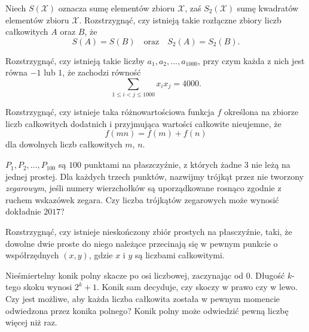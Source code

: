 \begin{problem}{1}
	Niech $S(\mathcal{X})$ oznacza sumę elementów zbioru $\mathcal{X}$, zaś $S_2(\mathcal{X})$ sumę kwadratów elementów zbioru $\mathcal{X}$. Rozstrzygnąć, czy istnieją takie rozłączne zbiory liczb całkowitych $A$ oraz $B$, że
	\[
		S(A) = S(B) \quad \text{oraz} \quad S_2(A) = S_2(B).
	\]
\end{problem}

\begin{problem}{1}
	Rozstrzygnąć, czy istnieją takie liczby $a_1, a_2, ..., a_{1000}$, przy czym każda z nich jest równa $-1$ lub $1$, że zachodzi równość
	\[
		\sum_{1 \leqslant i < j \leqslant 1000} x_ix_j = 4000.
	\]
\end{problem}

\begin{problem}{1}
	Rozstrzygnąć, czy istnieje taka różnowartościowa funkcja $f$ określona na zbiorze liczb całkowitych dodatnich i przyjmująca wartości całkowite nieujemne, że
	\[
		f(mn) = f(m) + f(n)
	\]
	dla dowolnych liczb całkowitych $m$, $n$.
\end{problem}


\begin{problem}{1}
	$P_1,P_2,\ldots,P_{100}$ są $100$ punktami na płaszczyźnie, z których żadne 3 nie leżą na jednej prostej. Dla każdych trzech punktów, nazwijmy trójkąt przez nie tworzony \textit{zegarowym}, jeśli numery wierzchołków są uporządkowane rosnąco zgodnie z ruchem wskazówek zegara. Czy liczba trójkątów zegarowych może wynosić dokładnie $2017$?
\end{problem}

\begin{problem}{1}
	Rozstrzygnąć, czy istnieje nieskończony zbiór prostych na płasczyźnie, taki, że dowolne dwie proste do niego należące przecinają się w pewnym punkcie o współrzędnych $(x, y)$, gdzie $x$ i $y$ są liczbami całkowitymi.
\end{problem}

\begin{problem}{1}
	Nieśmiertelny konik polny skacze po osi liczbowej, zaczynając od $0$. Długość $k$-tego skoku wynosi $2^k + 1$. Konik sam decyduje, czy skoczy w prawo czy w lewo. Czy jest możliwe, aby każda liczba całkowita została w pewnym momencie odwiedzona przez konika polnego? Konik polny może odwiedzić pewną liczbę więcej niż raz.
\end{problem}

